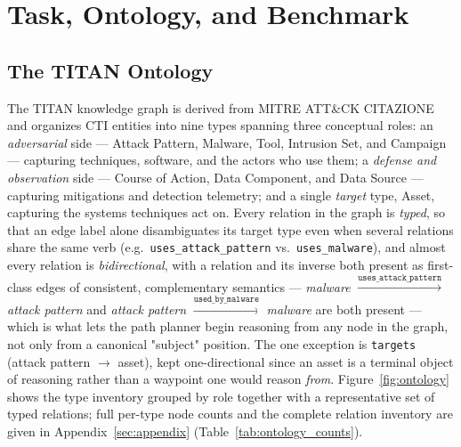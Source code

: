 \section{Task, Ontology, and Benchmark}
\label{sec:benchmark}

\subsection{The TITAN Ontology}
\label{sec:benchmark:ontology}

The TITAN knowledge graph is derived from MITRE ATT\&CK CITAZIONE and organizes CTI entities into nine types spanning three conceptual roles: an \emph{adversarial} side --- Attack Pattern, Malware, Tool, Intrusion Set, and Campaign --- capturing techniques, software, and the actors who use them; a \emph{defense and observation} side --- Course of Action, Data Component, and Data Source --- capturing mitigations and detection telemetry; and a single \emph{target} type, Asset, capturing the systems techniques act on. Every relation in the graph is \emph{typed}, so that an edge label alone disambiguates its target type even when several relations share the same verb (e.g.\ \texttt{uses\_attack\_pattern} vs.\ \texttt{uses\_malware}), and almost every relation is \emph{bidirectional}, with a relation and its inverse both present as first-class edges of consistent, complementary semantics ---
\emph{malware} $\xrightarrow{\texttt{uses\_attack\_pattern}}$ \emph{attack pattern} and \emph{attack pattern} $\xrightarrow{\texttt{used\_by\_malware}}$ \emph{malware} are both present --- which is what lets the path planner begin reasoning from any node in the graph, not only from a canonical "subject" position. The one exception is \texttt{targets} (attack pattern $\to$ asset), kept one-directional since an asset is a terminal object of reasoning rather than a waypoint one would reason \emph{from}. Figure~\ref{fig:ontology} shows the type inventory grouped by role together with a representative set of typed relations; full per-type node counts and the complete relation inventory are given in Appendix~\ref{sec:appendix} (Table~\ref{tab:ontology_counts}).

